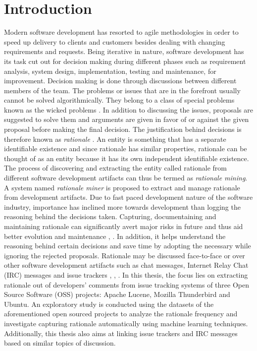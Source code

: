 \documentclass[a4paper,12pt,twoside]{report}
\begin{document}
\chapter{Introduction}
Modern software development has resorted to agile methodologies in order to speed up delivery to clients and customers besides dealing with changing requirements and requests. Being iterative in nature, software development has its task cut out for decision making during different phases such as requirement analysis, system design, implementation, testing and maintenance, for improvement. Decision making is done through discussions between different members of the team. The problems or issues that are in the forefront usually cannot be solved algorithmically. They belong to a class of special problems known as the wicked problems \cite{Rittel1973}. In addition to discussing the issues, proposals are suggested to solve them and arguments are given in favor of or against the given proposal before making the final decision. The justification behind decisions is therefore known as \textit{rationale} \cite{Dutoit2006}. An entity is something that has  a separate identifiable existence and since rationale has similar properties, rationale can be thought of as an entity because it has its own independent identifiable existence. The process of discovering and extracting the entity called rationale from different software development artifacts can thus be termed as \textit{rationale mining}. A system  named \textit{rationale miner} is proposed to extract and manage rationale from development artifacts. 
\newline \newline
Due to fast paced development nature of the software industry, importance has inclined more towards development than logging the reasoning behind the decisions taken. Capturing, documentaining and maintaining rationale can significantly avert major risks in future and thus aid better evolution and maintenance \cite{Bruegge2009}, \cite{Dutoit2006}. In addition, it helps understand the reasoning behind certain decisions and save time by adopting the necessary while ignoring the rejected proposals. Rationale may be discussed face-to-face or over other software development artifacts such as chat messages, Internet Relay Chat (\acs{IRC}) messages and issue trackers \cite{Lata2016}, \cite{Nonnenmacher2017},  \cite{Panichella2014}.  
\newline \newline
In this thesis, the focus lies on extracting rationale out of developers' comments from issue tracking systems of three Open Source Software (\acs{OSS}) projects: Apache Lucene, Mozilla Thunderbird and Ubuntu. An exploratory study is conducted using the datasets of the aforementioned open sourced projects to analyze the rationale frequency and investigate capturing rationale automatically using machine learning techniques. Additionally, this thesis also aims at linking issue trackers and \acs{IRC} messages based on similar topics of discussion. 
\end{document}
